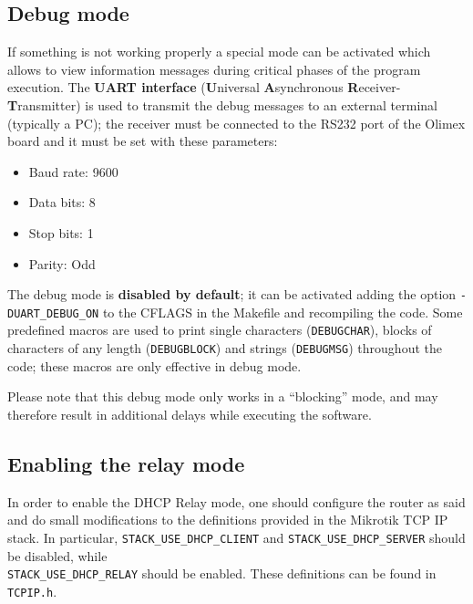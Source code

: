
\subsection{Debug mode}
If something is not working properly a special mode can be activated which allows to view information messages during critical phases of the program execution. The \textbf{UART interface} (\textbf{U}niversal \textbf{A}synchronous \textbf{R}eceiver-\textbf{T}ransmitter) is used to transmit the debug messages to an external terminal (typically a PC); the receiver must be connected to the RS232 port of the Olimex board and it must be set with these parameters:
\begin{itemize}
	\item Baud rate: 9600
	\item Data bits: 8
	\item Stop bits: 1
	\item Parity: Odd
\end{itemize}
The debug mode is \textbf{disabled by default}; it can be activated adding the option \texttt{-DUART\_DEBUG\_ON} to the CFLAGS in the Makefile and recompiling the code. Some predefined macros are used to print single characters (\texttt{DEBUGCHAR}), blocks of characters of any length (\texttt{DEBUGBLOCK}) and strings (\texttt{DEBUGMSG}) throughout the code; these macros are only effective in debug mode.

Please note that this debug mode only works in a ``blocking'' mode, and may therefore result in additional delays while executing the software.

\subsection{Enabling the relay mode}
In order to enable the DHCP Relay mode, one should configure the router as said and do small modifications to the definitions provided in the Mikrotik TCP IP stack. In particular, \texttt{STACK\_USE\_DHCP\_CLIENT} and \texttt{STACK\_USE\_DHCP\_SERVER} should be disabled, while \\\texttt{STACK\_USE\_DHCP\_RELAY} should be enabled. These definitions can be found in \texttt{TCPIP.h}.